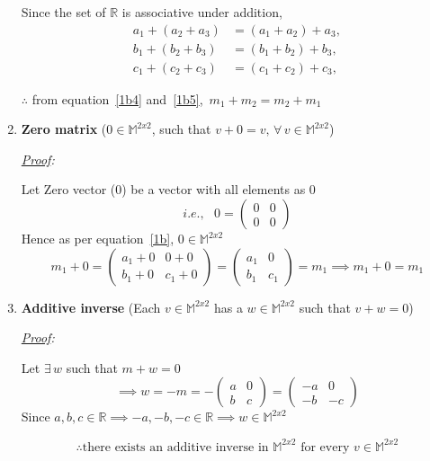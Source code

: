 \documentclass[12pt, letterpaper]{article}
\newcommand{\M}{\mathbb{M}^{2x2}}
\begin{document}
\begin{enumerate}
  Since the set of $\mathbb{R}$ is associative under addition,
  \begin{equation}
  \label{1b5}
  \begin{split}
    a_1 + (a_2 + a_3) &= (a_1 + a_2) + a_3,\\
    b_1 + (b_2 + b_3) &= (b_1 + b_2) + b_3,\\
    c_1 + (c_2 + c_3) &= (c_1 + c_2) + c_3,
  \end{split}
  \end{equation}

  $\therefore$ from equation~\ref{1b4} and~\ref{1b5},\,
  $\boxed{m_1 + m_2 = m_2 + m_1}$

\item \textbf{Zero matrix}
  ($0 \in \M$, such that $v + 0 = v, \, \forall \, v \in \M$)

\textit{\underline{Proof}:}

  Let Zero vector ($0$) be a vector with all elements as $0$
  \[ i.e., \,\,\,\, 0 = \begin{pmatrix}0&0\\0&0\end{pmatrix} \]
  Hence as per equation~\ref{1b}, $\boxed{0 \in \M}$
  \[
    m_1 + 0
    = \begin{pmatrix} a_1 + 0& 0 + 0\\ b_1 + 0& c_1 + 0 \end{pmatrix}
    = \begin{pmatrix} a_1& 0\\ b_1& c_1 \end{pmatrix}
    = m_1
    \implies \boxed{m_1 + 0 = m_1}
  \]

\item \textbf{Additive inverse}
  (Each $v \in \M$ has a $w \in \M$ such that $v + w = 0$)

\textit{\underline{Proof}:}

  Let $\exists \, w$ such that $m + w = 0$
  \[
    \implies w = -m = -\begin{pmatrix}a&0\\b&c\end{pmatrix}
    = \begin{pmatrix}-a&0\\-b&-c\end{pmatrix}
  \]
  Since $a, b, c \in \mathbb{R} \implies -a, -b, -c \in \mathbb{R} \implies w \in \M$

  \[ \boxed{\therefore \text{there exists an additive inverse in $\M$ for every }v \in \M} \]


\end{enumerate}
\end{document}
